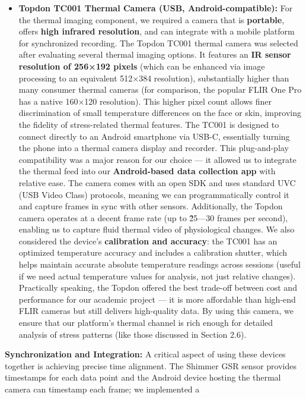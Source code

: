 \documentclass[11pt,a4paper]{report}
\begin{document}
\begin{itemize}
\item \textbf{Topdon TC001 Thermal Camera (USB, Android-compatible):} For the
  thermal imaging component, we required a camera that is \textbf{portable},
  offers \textbf{high infrared resolution}, and can integrate with a mobile
  platform for synchronized recording. The Topdon TC001 thermal camera
  was selected after evaluating several thermal imaging options. It
  features an \textbf{IR sensor resolution of 256×192 pixels} (which can be
  enhanced via image processing to an equivalent 512×384
  resolution)\cite{TopdonTC001},
  substantially higher than many consumer thermal cameras (for
  comparison, the popular FLIR One Pro has a native 160×120 resolution).
  This higher pixel count allows finer discrimination of small
  temperature differences on the face or skin, improving the fidelity of
  stress-related thermal features. The TC001 is designed to connect
  directly to an Android smartphone via USB-C, essentially turning the
  phone into a thermal camera display and recorder. This plug-and-play
  compatibility was a major reason for our choice --- it allowed us to
  integrate the thermal feed into our \textbf{Android-based data collection
  app} with relative ease. The camera comes with an open SDK and uses
  standard UVC (USB Video Class) protocols, meaning we can
  programmatically control it and capture frames in sync with other
  sensors. Additionally, the Topdon camera operates at a decent frame
  rate (up to \~25---30 frames per second), enabling us to capture fluid
  thermal video of physiological changes. We also considered the
  device's \textbf{calibration and accuracy}: the TC001 has an optimized
  temperature accuracy and includes a calibration shutter, which helps
  maintain accurate absolute temperature readings across sessions
  (useful if we need actual temperature values for analysis, not just
  relative changes). Practically speaking, the Topdon offered the best
  trade-off between cost and performance for our academic project --- it
  is more affordable than high-end FLIR cameras but still delivers
  high-quality data. By using this camera, we ensure that our platform's
  thermal channel is rich enough for detailed analysis of stress
  patterns (like those discussed in Section 2.6).

\end{itemize}
\textbf{Synchronization and Integration:} A critical aspect of using these
devices together is achieving precise time alignment. The Shimmer GSR
sensor provides timestamps for each data point and the Android device
hosting the thermal camera can timestamp each frame; we implemented a
\end{document}

